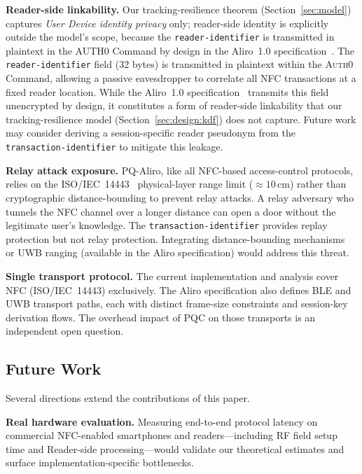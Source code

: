 \documentclass[runningheads]{llncs}
\begin{document}
\textbf{Reader-side linkability.}
Our tracking-resilience theorem (Section~\ref{sec:model}) captures \emph{User Device identity privacy} only; reader-side identity is explicitly outside the model's scope, because the \texttt{reader-identifier} is transmitted in plaintext in the AUTH0 Command by design in the Aliro~1.0 specification~\cite{CSA:Aliro10}.
The \texttt{reader-identifier} field (32 bytes) is transmitted in plaintext within
the \textsc{Auth0} Command, allowing a passive eavesdropper to correlate all NFC
transactions at a fixed reader location. While the Aliro~1.0 specification~\cite{CSA:Aliro10}
transmits this field unencrypted by design, it constitutes a form of reader-side
linkability that our tracking-resilience model (Section~\ref{sec:design:kdf}) does not
capture. Future work may consider deriving a session-specific reader pseudonym from
the \texttt{transaction-identifier} to mitigate this leakage.

\textbf{Relay attack exposure.}
PQ-Aliro, like all NFC-based access-control protocols, relies on the ISO/IEC~14443~\cite{ISOIEC14443}
physical-layer range limit (${\approx}10$\,cm) rather than cryptographic distance-bounding
to prevent relay attacks. A relay adversary who tunnels the NFC
channel over a longer distance can open a door without the legitimate user's
knowledge. The \texttt{transaction-identifier} provides replay protection but
not relay protection. Integrating distance-bounding mechanisms~\cite{CSA:Aliro10}
or UWB ranging (available in the Aliro specification) would address this threat.

\textbf{Single transport protocol.}
The current implementation and analysis cover NFC (ISO/IEC~14443) exclusively. The Aliro specification also defines BLE and UWB transport paths, each with distinct frame-size constraints and session-key derivation flows. The overhead impact of PQC on those transports is an independent open question.

\subsection{Future Work}
\label{subsec:futurework}

Several directions extend the contributions of this paper.

\textbf{Real hardware evaluation.}
Measuring end-to-end protocol latency on commercial NFC-enabled smartphones and readers---including RF field setup time and Reader-side processing---would validate our theoretical estimates and surface implementation-specific bottlenecks.
\end{document}
